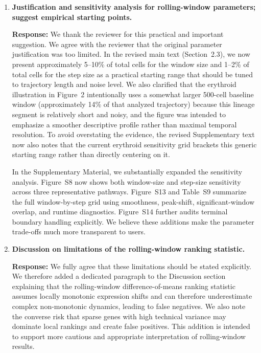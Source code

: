 \documentclass[11pt]{article}
\begin{document}
\begin{enumerate}[leftmargin=1.5em]
\item \textbf{Justification and sensitivity analysis for rolling-window parameters; suggest empirical starting points.}

\textbf{Response:} We thank the reviewer for this practical and important suggestion. We agree with the reviewer that the original parameter justification was too limited. In the revised main text (Section~2.3), we now present approximately 5--10\% of total cells for the window size and 1--2\% of total cells for the step size as a practical starting range that should be tuned to trajectory length and noise level. We also clarified that the erythroid illustration in Figure~2 intentionally uses a somewhat larger 500-cell baseline window (approximately 14\% of that analyzed trajectory) because this lineage segment is relatively short and noisy, and the figure was intended to emphasize a smoother descriptive profile rather than maximal temporal resolution. To avoid overstating the evidence, the revised Supplementary text now also notes that the current erythroid sensitivity grid brackets this generic starting range rather than directly centering on it.

In the Supplementary Material, we substantially expanded the sensitivity analysis. Figure~S8 now shows both window-size and step-size sensitivity across three representative pathways. Figure~S13 and Table~S9 summarize the full window-by-step grid using smoothness, peak-shift, significant-window overlap, and runtime diagnostics. Figure~S14 further audits terminal boundary handling explicitly. We believe these additions make the parameter trade-offs much more transparent to users.

\item \textbf{Discussion on limitations of the rolling-window ranking statistic.}

\textbf{Response:} We fully agree that these limitations should be stated explicitly. We therefore added a dedicated paragraph to the Discussion section explaining that the rolling-window difference-of-means ranking statistic assumes locally monotonic expression shifts and can therefore underestimate complex non-monotonic dynamics, leading to false negatives. We also note the converse risk that sparse genes with high technical variance may dominate local rankings and create false positives. This addition is intended to support more cautious and appropriate interpretation of rolling-window results.
\end{enumerate}
\end{document}
